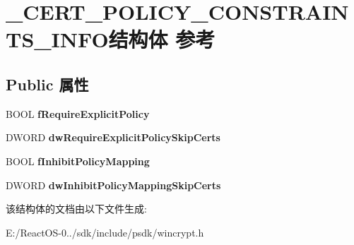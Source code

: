 \hypertarget{struct___c_e_r_t___p_o_l_i_c_y___c_o_n_s_t_r_a_i_n_t_s___i_n_f_o}{}\section{\+\_\+\+C\+E\+R\+T\+\_\+\+P\+O\+L\+I\+C\+Y\+\_\+\+C\+O\+N\+S\+T\+R\+A\+I\+N\+T\+S\+\_\+\+I\+N\+F\+O结构体 参考}
\label{struct___c_e_r_t___p_o_l_i_c_y___c_o_n_s_t_r_a_i_n_t_s___i_n_f_o}
\subsection*{Public 属性}
\begin{DoxyCompactItemize}
\item 
\mbox{\label{struct___c_e_r_t___p_o_l_i_c_y___c_o_n_s_t_r_a_i_n_t_s___i_n_f_o_adeec4f2a47c57b99ab0d87dd7a276a9a}} 
B\+O\+OL {\bfseries f\+Require\+Explicit\+Policy}
\item 
\mbox{\label{struct___c_e_r_t___p_o_l_i_c_y___c_o_n_s_t_r_a_i_n_t_s___i_n_f_o_a8774650f8714c6a6497f8ec6946e63ca}} 
D\+W\+O\+RD {\bfseries dw\+Require\+Explicit\+Policy\+Skip\+Certs}
\item 
\mbox{\label{struct___c_e_r_t___p_o_l_i_c_y___c_o_n_s_t_r_a_i_n_t_s___i_n_f_o_a3148ab8ff97b850a1b043742fb5e9455}} 
B\+O\+OL {\bfseries f\+Inhibit\+Policy\+Mapping}
\item 
\mbox{\label{struct___c_e_r_t___p_o_l_i_c_y___c_o_n_s_t_r_a_i_n_t_s___i_n_f_o_a7fc4245391d34ed7e32dfd9dd9170b5e}} 
D\+W\+O\+RD {\bfseries dw\+Inhibit\+Policy\+Mapping\+Skip\+Certs}
\end{DoxyCompactItemize}


该结构体的文档由以下文件生成\+:\begin{DoxyCompactItemize}
\item 
E\+:/\+React\+O\+S-\/0../sdk/include/psdk/wincrypt.\+h\end{DoxyCompactItemize}
